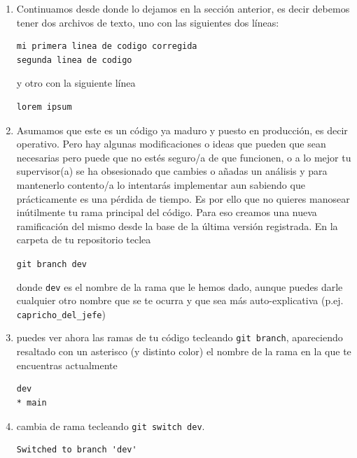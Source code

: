 \documentclass[a4paper,11pt]{report}
\newcommand{\cverb}{\Verb}
\begin{document}
    \begin{enumerate}
     \item Continuamos desde donde lo dejamos en la sección anterior, es decir debemos tener dos archivos de texto, uno con las siguientes dos líneas:
     \begin{lstlisting}[style=custom]
mi primera linea de codigo corregida
segunda linea de codigo
     \end{lstlisting}
     
     y otro con la siguiente línea
     
    \begin{lstlisting}[style=custom]
lorem ipsum
    \end{lstlisting}
    
    \item Asumamos que este es un código ya maduro y puesto en producción, es decir operativo. Pero hay algunas modificaciones o ideas que pueden que sean necesarias pero puede que no estés seguro/a de que funcionen, o a lo mejor tu supervisor(a) se ha obsesionado que cambies o añadas un análisis y para mantenerlo contento/a lo intentarás implementar aun sabiendo que prácticamente es una pérdida de tiempo. Es por ello que no quieres manosear inútilmente tu rama principal del código. Para eso creamos una nueva ramificación del mismo desde la base de la última versión registrada. En la carpeta de tu repositorio teclea
    
    \cverb+git branch dev+
    
    donde \verb+dev+ es el nombre de la rama que le hemos dado, aunque puedes darle cualquier otro nombre que se te ocurra y que sea más auto-explicativa (p.ej. \verb+capricho_del_jefe+)
    
    \item puedes ver ahora las ramas de tu código tecleando \cverb+git branch+, apareciendo resaltado con un asterisco (y distinto color) el nombre de la rama en la que te encuentras actualmente
    
    \begin{lstlisting}[style=custom]
  dev
* main
    \end{lstlisting}

    \item cambia de rama tecleando \cverb+git switch dev+.
    
    \begin{lstlisting}[style=custom]
Switched to branch 'dev'
    \end{lstlisting}
    

\end{enumerate}
\end{document}
